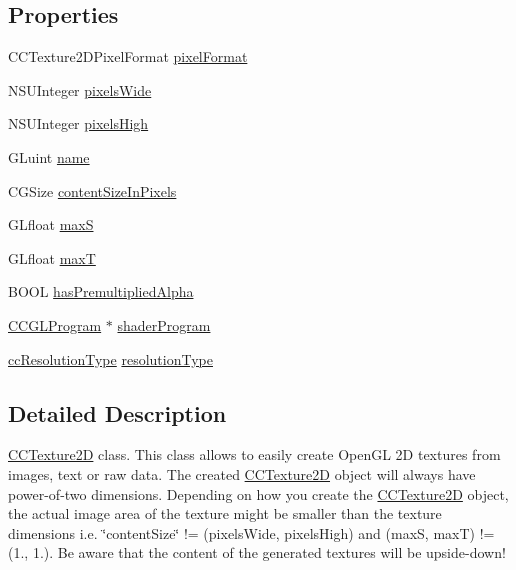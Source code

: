 \subsection*{Properties}
\begin{DoxyCompactItemize}
\item 
C\-C\-Texture2\-D\-Pixel\-Format \hyperlink{class_c_c_texture2_d_a8c41340ab06df5f92ed08dfae1d52cbf}{pixel\-Format}
\item 
N\-S\-U\-Integer \hyperlink{class_c_c_texture2_d_aa10cf350abdbbf21f079fa1faa4da95a}{pixels\-Wide}
\item 
N\-S\-U\-Integer \hyperlink{class_c_c_texture2_d_ab0589fe4207a83b59b3e3de26bf0de86}{pixels\-High}
\item 
G\-Luint \hyperlink{class_c_c_texture2_d_acff887dadb97c08201b2b8fca4412898}{name}
\item 
C\-G\-Size \hyperlink{class_c_c_texture2_d_a4df3800d331389f083bf2044023a2831}{content\-Size\-In\-Pixels}
\item 
G\-Lfloat \hyperlink{class_c_c_texture2_d_a836fc67ca10abb68e21768095c534035}{max\-S}
\item 
G\-Lfloat \hyperlink{class_c_c_texture2_d_a4eb0911f8970213068825220db9e1866}{max\-T}
\item 
B\-O\-O\-L \hyperlink{class_c_c_texture2_d_a5fde1910a75b87939fe6d4632c6de2ce}{has\-Premultiplied\-Alpha}
\item 
\hyperlink{interface_c_c_g_l_program}{C\-C\-G\-L\-Program} $\ast$ \hyperlink{class_c_c_texture2_d_af6b133645d399a04495267235bf0651a}{shader\-Program}
\item 
\hyperlink{cc_types_8h_a3fccc5ae3efabdf2bb0aebafe9620f5d}{cc\-Resolution\-Type} \hyperlink{class_c_c_texture2_d_ace9dffd6f51333af7c82f5f0afbf35f5}{resolution\-Type}
\end{DoxyCompactItemize}


\subsection{Detailed Description}
\hyperlink{class_c_c_texture2_d}{C\-C\-Texture2\-D} class. This class allows to easily create Open\-G\-L 2\-D textures from images, text or raw data. The created \hyperlink{class_c_c_texture2_d}{C\-C\-Texture2\-D} object will always have power-\/of-\/two dimensions. Depending on how you create the \hyperlink{class_c_c_texture2_d}{C\-C\-Texture2\-D} object, the actual image area of the texture might be smaller than the texture dimensions i.\-e. \char`\"{}content\-Size\char`\"{} != (pixels\-Wide, pixels\-High) and (max\-S, max\-T) != (1., 1.). Be aware that the content of the generated textures will be upside-\/down! 

